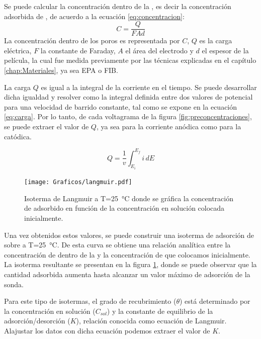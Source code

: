		Se puede calcular la concentración dentro de la \pdm, es decir la concentración adsorbida de \ru, de acuerdo a la ecuación \ref{eq:concentracion}:
				\begin{equation}
					C=\frac{Q}{FAd}
					\label{eq:concentracion}
					\end{equation}
		La concentración dentro de los poros es representada por $C$, $Q$ es la carga eléctrica, $F$ la constante de Faraday, $A$ el área del electrodo y $d$ el espesor de la película, la cual fue medida previamente por las técnicas explicadas en el capítulo \ref{chap:Materiales}, ya sea EPA o FIB.

		La carga $Q$ es igual a la integral de la corriente en el tiempo. Se puede desarrollar dicha igualdad y resolver como la integral definida entre dos valores de potencial para una velocidad de barrido constante, tal como se expone en la ecuación \ref{eq:carga}. Por lo tanto, de cada voltagrama de la figura \ref{fig:preconcentraciones}, se puede extraer el valor de $Q$, ya sea para la corriente anódica como para la catódica.
		
			\begin{equation}
					Q=\frac{1}{v}\int_{E_{i}}^{E_{f}} i\,dE
					\label{eq:carga}
			\end{equation}
	
			\begin{figure}[b!]
					\centering
			 	    \texttt{[image: Graficos/langmuir.pdf]}
			        \caption[Isoterma de Langmuir]{Isoterma de Langmuir a T=\SI{25}{\celsius} donde se gráfica la concentración de \aminorutenio\space adsorbido en función de la concentración en solución colocada inicialmente.}
			        \label{fig:langmuir}
		      	\end{figure} 

		Una vez obtenidos estos valores, se puede construir una isoterma de adsorción de \ru\space sobre \pdmF\space a T=\SI{25}{\celsius}. De esta curva se obtiene una relación analítica entre la concentración de \ru\space dentro de la \pdm\space y la concentración de \ru\space que colocamos inicialmente. La isoterma resultante se presentan en la figura \ref{fig:langmuir}, donde se puede observar que la cantidad adsorbida aumenta hasta alcanzar un valor máximo de adsorción de la sonda.

		Para este tipo de isotermas, el grado de recubrimiento ($\theta$) está determinado por la concentración en solución ($C_{sol}$) y la constante de equilibrio de la adsorción/desorción ($K$), relación conocida como ecuación de Langmuir. Al\space ajustar los datos con dicha ecuación podemos extraer el valor de $K$.

